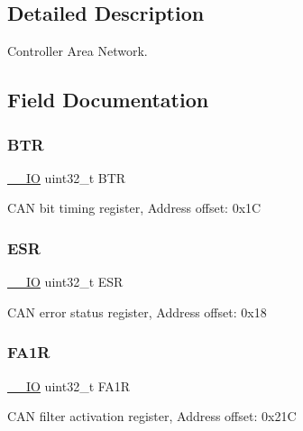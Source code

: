 \subsection{Detailed Description}
Controller Area Network. 

\subsection{Field Documentation}
\mbox{\label{struct_c_a_n___type_def_a5c0fcd3e7b4c59ab1dd68f6bd8f74e07}} 
\subsubsection{\texorpdfstring{B\+TR}{BTR}}
{\footnotesize\ttfamily \hyperlink{core__sc300_8h_aec43007d9998a0a0e01faede4133d6be}{\+\_\+\+\_\+\+IO} uint32\+\_\+t B\+TR}

C\+AN bit timing register, Address offset\+: 0x1C \mbox{\label{struct_c_a_n___type_def_a2b39f943954e0e7d177b511d9074a0b7}} 
\subsubsection{\texorpdfstring{E\+SR}{ESR}}
{\footnotesize\ttfamily \hyperlink{core__sc300_8h_aec43007d9998a0a0e01faede4133d6be}{\+\_\+\+\_\+\+IO} uint32\+\_\+t E\+SR}

C\+AN error status register, Address offset\+: 0x18 \mbox{\label{struct_c_a_n___type_def_aaf76271f4ab0b3deb3ceb6e2ac0d62d0}} 
\subsubsection{\texorpdfstring{F\+A1R}{FA1R}}
{\footnotesize\ttfamily \hyperlink{core__sc300_8h_aec43007d9998a0a0e01faede4133d6be}{\+\_\+\+\_\+\+IO} uint32\+\_\+t F\+A1R}

C\+AN filter activation register, Address offset\+: 0x21C \mbox{\label{struct_c_a_n___type_def_af1405e594e39e5b34f9499f680157a25}} 
